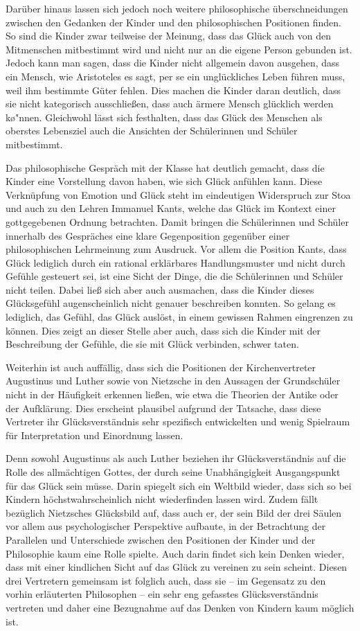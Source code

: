 Darüber hinaus lassen sich jedoch noch weitere philosophische überschneidungen zwischen den Gedanken der Kinder und den philosophischen Positionen finden. 
So sind die Kinder zwar teilweise der Meinung, dass das Glück auch von den Mitmenschen mitbestimmt wird und nicht nur an die eigene Person gebunden ist. 
Jedoch kann man sagen, dass die Kinder nicht allgemein davon ausgehen, dass ein Mensch, wie Aristoteles es sagt, per se ein unglückliches Leben führen muss, weil ihm bestimmte Güter fehlen. 
Dies machen die Kinder daran deutlich, dass sie nicht kategorisch ausschließen, dass auch ärmere Mensch glücklich werden k\o"nnen.
Gleichwohl lässt sich festhalten, dass das Glück des Menschen als oberstes Lebensziel auch die Ansichten der Schülerinnen und Schüler mitbestimmt. 

Das philosophische Gespräch mit der Klasse hat deutlich gemacht, dass die Kinder eine Vorstellung davon haben, wie sich Glück anfühlen kann. 
Diese Verknüpfung von Emotion und Glück steht im eindeutigen Widerspruch zur Stoa und auch zu den Lehren Immanuel Kants, welche das Glück im Kontext einer gottgegebenen Ordnung betrachten.
Damit bringen die Schülerinnen und Schüler innerhalb des Gespräches  eine klare Gegenposition gegenüber einer philosophischen Lehrmeinung  zum Ausdruck. 
Vor allem die Position Kants, dass Glück lediglich durch ein rational erklärbares Handlungsmuster und nicht durch Gefühle gesteuert sei, ist eine Sicht der Dinge, die die Schülerinnen und Schüler nicht teilen. 
Dabei ließ sich aber auch ausmachen, dass die Kinder dieses Glücksgefühl augenscheinlich nicht genauer beschreiben konnten.
So gelang es lediglich, das Gefühl, das Glück auslöst, in einem gewissen Rahmen eingrenzen zu können.
Dies zeigt an dieser Stelle aber auch, dass sich die Kinder mit der Beschreibung der Gefühle, die sie mit Glück verbinden, schwer taten.

Weiterhin ist auch auffällig, dass sich die Positionen der Kirchenvertreter Augustinus und Luther sowie von Nietzsche in den Aussagen der Grundschüler nicht in der Häufigkeit erkennen ließen, wie etwa die Theorien der Antike oder der Aufklärung. 
Dies erscheint plausibel aufgrund der Tatsache, dass diese Vertreter ihr Glücksverständnis sehr spezifisch entwickelten und wenig Spielraum für Interpretation und Einordnung lassen. 

Denn sowohl Augustinus als auch Luther beziehen ihr Glücksverständnis auf die Rolle des allmächtigen Gottes, der durch seine Unabhängigkeit Ausgangspunkt für das Glück sein müsse. 
Darin spiegelt sich ein Weltbild wieder, dass sich so bei Kindern höchstwahrscheinlich nicht wiederfinden lassen wird. 
Zudem fällt bezüglich Nietzsches Glücksbild auf, dass auch er, der sein Bild der drei Säulen vor allem aus psychologischer Perspektive  aufbaute, in der Betrachtung der Parallelen und Unterschiede zwischen den Positionen der Kinder und der Philosophie kaum eine Rolle spielte. 
Auch darin findet sich kein Denken wieder, dass mit einer kindlichen Sicht auf das Glück zu vereinen zu sein scheint. 
Diesen drei Vertretern gemeinsam ist folglich auch, dass sie -- im Gegensatz zu den vorhin erläuterten Philosophen -- ein sehr eng gefasstes Glücksverständnis vertreten und daher eine Bezugnahme auf das Denken von Kindern kaum möglich ist. 

